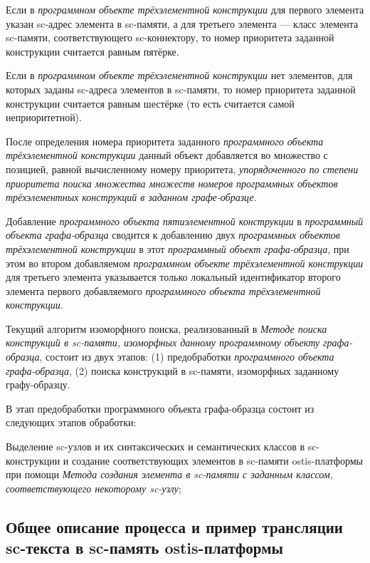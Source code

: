 \begin{textitemize}
\begin{textitemize}
		\item Если в \textit{программном объекте трёхэлементной конструкции} для первого элемента указан sc-адрес элемента в sc-памяти, а для третьего элемента --- класс элемента sc-памяти, соответствующего sc-коннектору, то номер приоритета заданной конструкции считается равным пятёрке.
		\item Если в \textit{программном объекте трёхэлементной конструкции} нет элементов, для которых заданы sc-адреса элементов в sc-памяти, то номер приоритета заданной конструкции считается равным шестёрке (то есть считается самой неприоритетной).
	\end{textitemize}
	После определения номера приоритета заданного \textit{программного объекта трёхэлементной конструкции} данный объект добавляется во множество с позицией, равной вычисленному номеру приоритета, \textit{упорядоченного по степени приоритета поиска множества множеств номеров программных объектов трёхэлементных конструкций в заданном графе-образце}.
\end{textitemize}

Добавление \textit{программного объекта пятиэлементной конструкции} в \textit{программный объекта графа-образца} сводится к добавлению двух \textit{программных объектов трёхэлементной конструкции} в этот \textit{программный объект графа-образца}, при этом во втором добавляемом \textit{программном объекте трёхэлементной конструкции} для третьего элемента указывается только локальный идентификатор второго элемента первого добавляемого \textit{программного объекта трёхэлементной конструкции}.

Текущий алгоритм изоморфного поиска, реализованный в \textit{Методе поиска конструкций в sc-памяти, изоморфных данному программному объекту графа-образца}, состоит из двух этапов: (1) предобработки \textit{программного объекта графа-образца}, (2) поиска конструкций в sc-памяти, изоморфных заданному графу-образцу.

В этап предобработки программного объекта графа-образца состоит из следующих этапов обработки:
\begin{textitemize}
	\item Выделение sc-узлов и их синтаксических и семантических классов в sc-конструкции и создание соответствующих элементов в sc-памяти ostis-платформы при помощи \textit{Метода создания элемента в sc-памяти с заданным классом, соответствующего некоторому sc-узлу};
\end{textitemize}

\subsection{Общее описание процесса и пример трансляции sc-текста в sc-память ostis-платформы}
\label{sec_soft_platform_scin_code_example}

